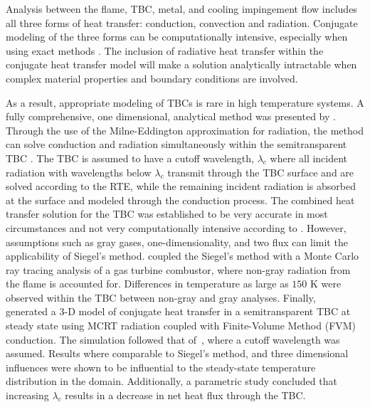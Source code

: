 Analysis between the flame, TBC, metal, and cooling impingement flow includes all three forms of heat
transfer: conduction, convection and radiation. Conjugate modeling of the three forms can be computationally intensive, especially when using exact methods \cite{Viskanta1975HeatSolids}. 
The inclusion of radiative heat transfer within the conjugate heat transfer model will make a solution analytically intractable when complex material properties and boundary conditions are involved.

As a result, appropriate modeling of TBCs is rare in high temperature systems. A fully comprehensive, one dimensional, analytical method was presented by \citet{Siegel1996InternalCoatings}. Through the use of the Milne-Eddington approximation for radiation, the method can solve conduction and radiation simultaneously
within the semitransparent TBC \cite{Milne1930ThermodynamicsStars,Eddington1920TheStars}. The TBC is assumed to have a cutoff wavelength, $\lambda{}_c$ where all incident radiation with wavelengths below $\lambda{}_c$ transmit through the TBC surface and are solved according to the RTE, while the remaining incident radiation is absorbed at the surface and modeled through the conduction process.
The combined heat transfer solution for the TBC was established to be very accurate in most circumstances and not very computationally intensive according to \citet{Siegel1996InternalCoatings}. 
However, assumptions such as gray gases, one-dimensionality, and two flux can limit the applicability of Siegel’s method. \citet{Johnson2021AnalysisMethod} coupled the Siegel’s method with a Monte Carlo ray tracing analysis of a gas turbine combustor, where non-gray radiation from the flame is accounted for. Differences in temperature as large as $150$ K were observed within the TBC between non-gray and gray analyses.
Finally,~\citet{Tricard2021ModelingEnvironments.} generated a 3-D model of conjugate heat transfer in a semitransparent TBC at steady state using MCRT radiation coupled with Finite-Volume Method (FVM) conduction. 
The simulation followed that of~\cite{Siegel1996InternalCoatings}, where a cutoff wavelength was assumed.
Results where comparable to Siegel's method, and three dimensional influences were shown to be influential to the steady-state temperature distribution in the domain. Additionally, a parametric study concluded that increasing $\lambda{}_c$ results in a decrease in net heat flux through the TBC.

